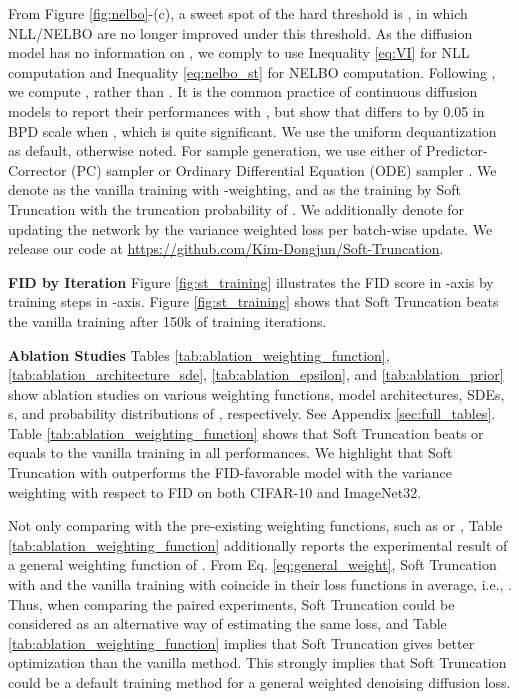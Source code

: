 \documentclass[nohyperref]{article}
\theoremstyle{plain}
\theoremstyle{definition}
\theoremstyle{remark}
\begin{document}
From Figure \ref{fig:nelbo}-(c), a sweet spot of the hard threshold is , in which NLL/NELBO are no longer improved under this threshold. As the diffusion model has no information on , we comply \citet{kim2022maximum} to use Inequality \eqref{eq:VI} for NLL computation and Inequality \eqref{eq:nelbo_st} for NELBO computation. Following \citet{kim2022maximum}, we compute , rather than . It is the common practice of continuous diffusion models \cite{song2020score, song2021maximum, dockhorn2021score} to report their performances with , but \citet{kim2022maximum} show that  differs to  by 0.05 in BPD scale when , which is quite significant. We use the uniform dequantization \cite{theis2016note} as default, otherwise noted. For sample generation, we use either of Predictor-Corrector (PC) sampler or Ordinary Differential Equation (ODE) sampler \cite{song2020score}. We denote  as the vanilla training with -weighting, and  as the training by Soft Truncation with the truncation probability of . We additionally denote  for updating the network by the variance weighted loss per batch-wise update. We release our code at \url{https://github.com/Kim-Dongjun/Soft-Truncation}.

\textbf{FID by Iteration} Figure \ref{fig:st_training} illustrates the FID score \cite{heusel2017gans} in -axis by training steps in -axis. Figure \ref{fig:st_training} shows that Soft Truncation beats the vanilla training after 150k of training iterations.

\textbf{Ablation Studies} Tables \ref{tab:ablation_weighting_function}, \ref{tab:ablation_architecture_sde}, \ref{tab:ablation_epsilon}, and \ref{tab:ablation_prior} show ablation studies on various weighting functions, model architectures, SDEs, s, and probability distributions of , respectively. See Appendix \ref{sec:full_tables}. Table \ref{tab:ablation_weighting_function} shows that Soft Truncation beats or equals to the vanilla training in all performances. We highlight that Soft Truncation with  outperforms the FID-favorable model with the variance weighting with respect to FID on both CIFAR-10 and ImageNet32.

Not only comparing with the pre-existing weighting functions, such as  or , Table \ref{tab:ablation_weighting_function} additionally reports the experimental result of a general weighting function of . From Eq. \eqref{eq:general_weight}, Soft Truncation with  and the vanilla training with  coincide in their loss functions in average, i.e., . Thus, when comparing the paired experiments, Soft Truncation could be considered as an alternative way of estimating the same loss, and Table \ref{tab:ablation_weighting_function} implies that Soft Truncation gives better optimization than the vanilla method. This strongly implies that Soft Truncation could be a default training method for a general weighted denoising diffusion loss.
\end{document}
